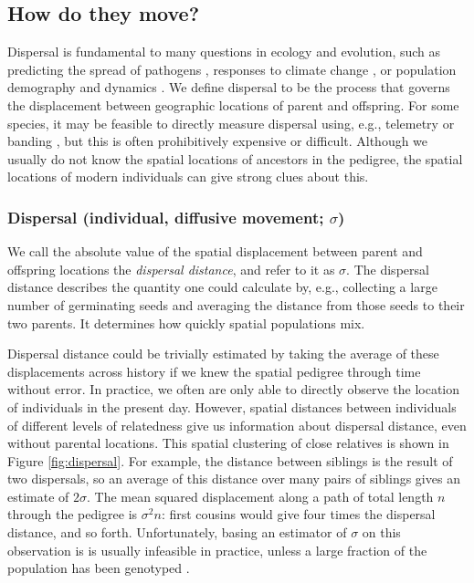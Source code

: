\documentclass{ar-1col}
\begin{document}
\subsection{How do they move?}

Dispersal is fundamental to many questions in ecology and evolution,
such as
predicting the spread of pathogens \citep{BiekReal2010},
responses to climate change \citep{parmesan2006},
or population demography and dynamics \citep{schreiber2010interactive}.
We define dispersal to be the process that governs 
the displacement between geographic locations of parent and offspring.
For some species,
it may be feasible to directly measure dispersal 
using, e.g., telemetry or banding \citep{Cayuela2018demographic},
but this is often prohibitively expensive or difficult.
Although we usually do not know the spatial locations of ancestors in the pedigree,
the spatial locations of modern individuals can give strong clues about this.


\subsubsection{Dispersal (individual, diffusive movement; $\sigma$)}

We call the absolute value of the spatial displacement between parent and offspring locations
the \textit{dispersal distance}, and refer to it as $\sigma$.
The dispersal distance describes the quantity one could calculate by,
e.g., collecting a large number of germinating seeds
and averaging the distance from those seeds to their two parents.
It determines how quickly spatial populations mix.

Dispersal distance could be trivially estimated by taking
the average of these displacements across history
if we knew the spatial pedigree through time without error.
In practice, we often are only able to directly observe
the location of individuals in the present day.
However, 
spatial distances between individuals of different levels of relatedness
give us information about dispersal distance, even without parental locations.
This spatial clustering of close relatives
is shown in Figure \ref{fig:dispersal}.
For example,
the distance between siblings is the result of two dispersals,
so an average of this distance over many pairs of siblings 
gives an estimate of $2 \sigma$.
The mean squared displacement along
a path of total length $n$ through the pedigree is $\sigma^2 n$:
first cousins would give four times the dispersal distance, and so forth.
Unfortunately, basing an estimator of $\sigma$ on this observation
is is usually infeasible in practice,
unless a large fraction of the population has been genotyped
\citep[e.g.,][]{Aguillon2017deconstructing}.
\end{document}
